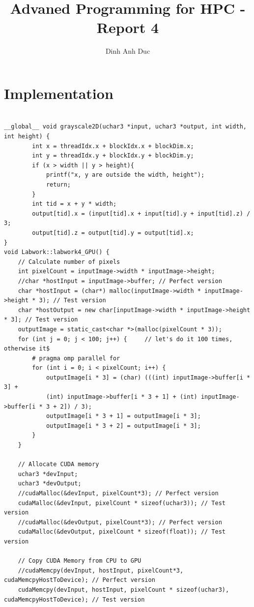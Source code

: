 \documentclass{article}
\title{Advaned Programming for HPC - Report 4}
\author{Dinh Anh Duc}
\begin{document}
\maketitle

\section*{Implementation}
\footnotesize\begin{lstlisting}

__global__ void grayscale2D(uchar3 *input, uchar3 *output, int width, int height) {
        int x = threadIdx.x + blockIdx.x + blockDim.x;
        int y = threadIdx.y + blockIdx.y + blockDim.y;
        if (x > width || y > height){
            printf("x, y are outside the width, height");
            return;
        }
        int tid = x + y * width; 
	    output[tid].x = (input[tid].x + input[tid].y + input[tid].z) / 3;
        output[tid].z = output[tid].y = output[tid].x;
}
void Labwork::labwork4_GPU() {
    // Calculate number of pixels
    int pixelCount = inputImage->width * inputImage->height;	
    //char *hostInput = inputImage->buffer; // Perfect version
    char *hostInput = (char*) malloc(inputImage->width * inputImage->height * 3); // Test version
    char *hostOutput = new char[inputImage->width * inputImage->height * 3]; // Test version
    outputImage = static_cast<char *>(malloc(pixelCount * 3));
    for (int j = 0; j < 100; j++) {     // let's do it 100 times, otherwise it$
        # pragma omp parallel for
        for (int i = 0; i < pixelCount; i++) {
            outputImage[i * 3] = (char) (((int) inputImage->buffer[i * 3] + 
            (int) inputImage->buffer[i * 3 + 1] + (int) inputImage->buffer[i * 3 + 2]) / 3);
            outputImage[i * 3 + 1] = outputImage[i * 3];
            outputImage[i * 3 + 2] = outputImage[i * 3];
        }
    }

    // Allocate CUDA memory    
    uchar3 *devInput;
    uchar3 *devOutput;
    //cudaMalloc(&devInput, pixelCount*3); // Perfect version
    cudaMalloc(&devInput, pixelCount * sizeof(uchar3)); // Test version
    //cudaMalloc(&devOutput, pixelCount*3); // Perfect version
    cudaMalloc(&devOutput, pixelCount * sizeof(float)); // Test version
    
    // Copy CUDA Memory from CPU to GPU
    //cudaMemcpy(devInput, hostInput, pixelCount*3, cudaMemcpyHostToDevice); // Perfect version
    cudaMemcpy(devInput, hostInput, pixelCount * sizeof(uchar3), cudaMemcpyHostToDevice); // Test version



\end{lstlisting}
\end{document}
